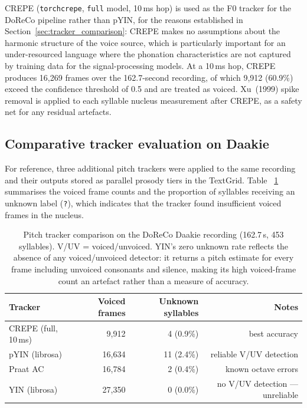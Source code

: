 CREPE (\texttt{torchcrepe}, \texttt{full} model, 10\,ms hop) is used as the
F0 tracker for the DoReCo pipeline rather than pYIN, for the reasons established
in Section~\ref{sec:tracker_comparison}: CREPE makes no assumptions about the
harmonic structure of the voice source, which is particularly important for an
under-resourced language where the phonation characteristics are not captured by
training data for the signal-processing models. At a 10\,ms hop, CREPE produces
16,269 frames over the 162.7-second recording, of which 9,912 (60.9\%) exceed
the confidence threshold of 0.5 and are treated as voiced. Xu~(1999) spike
removal is applied to each syllable nucleus measurement after CREPE, as a safety
net for any residual artefacts.

\subsection{Comparative tracker evaluation on Daakie}

For reference, three additional pitch trackers were applied to the same recording
and their outputs stored as parallel prosody tiers in the TextGrid. Table~%
\ref{tab:daakie_trackers} summarises the voiced frame counts and the proportion
of syllables receiving an unknown label (\texttt{?}), which indicates that the
tracker found insufficient voiced frames in the nucleus.

\begin{table}[h]
\centering
\begin{tabular}{lrrr}
\hline
Tracker & Voiced frames & Unknown syllables & Notes \\
\hline
CREPE (full, 10\,ms)  & 9{,}912  & 4 (0.9\%)  & best accuracy \\
pYIN (librosa)        & 16{,}634 & 11 (2.4\%) & reliable V/UV detection \\
Praat AC              & 16{,}784 & 2 (0.4\%)  & known octave errors \\
YIN (librosa)         & 27{,}350 & 0 (0.0\%)  & no V/UV detection --- unreliable \\
\hline
\end{tabular}
\caption{Pitch tracker comparison on the DoReCo Daakie recording (162.7\,s,
453 syllables). V/UV = voiced/unvoiced. YIN's zero unknown rate reflects the
absence of any voiced/unvoiced detector: it returns a pitch estimate for every
frame including unvoiced consonants and silence, making its high voiced-frame
count an artefact rather than a measure of accuracy.}
\label{tab:daakie_trackers}
\end{table}

